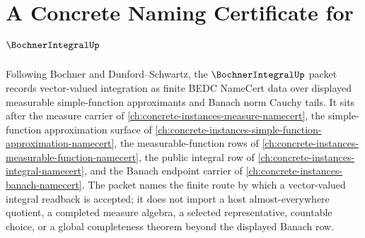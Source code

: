 \chapter{A Concrete Naming Certificate for $\BochnerIntegralUp$}
\label{ch:concrete-instances-bochner-integral-namecert}

Following Bochner and Dunford--Schwartz, the $\BochnerIntegralUp$ packet records vector-valued integration as finite BEDC NameCert data over displayed measurable simple-function approximants and Banach norm Cauchy tails. It sits after the measure carrier of \autoref{ch:concrete-instances-measure-namecert}, the simple-function approximation surface of \autoref{ch:concrete-instances-simple-function-approximation-namecert}, the measurable-function rows of \autoref{ch:concrete-instances-measurable-function-namecert}, the public integral row of \autoref{ch:concrete-instances-integral-namecert}, and the Banach endpoint carrier of \autoref{ch:concrete-instances-banach-namecert}. The packet names the finite route by which a vector-valued integral readback is accepted; it does not import a host almost-everywhere quotient, a completed measure algebra, a selected representative, countable choice, or a global completeness theorem beyond the displayed Banach row.

